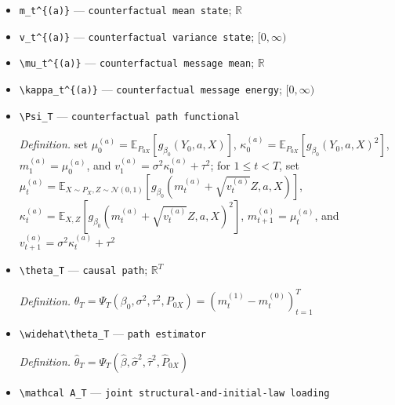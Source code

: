 \documentclass{article}
\begin{document}
\begin{itemize}
  \par\smallskip\noindent\emph{Definition.} write \(\bar e=N^{-1}\sum_j\widehat e_j\), \(\widehat z_{m,i}=\widehat e_i-\bar e\), and \(\widehat z_{v,i}=\widehat e_i\circ\widehat e_i-N^{-1}\sum_j\widehat e_j\circ\widehat e_j\); then \(\widehat\zeta_i=(\widehat L\widehat z_{m,i},\widehat A_v\{\widehat z_{v,i}-\widehat\sigma^2\widehat Q_\beta\widehat L\widehat z_{m,i}\},\delta_{(Y_{i0},X_i)}-\widehat P_{0X})\)
  \item \texttt{m\_\allowbreak{}t\textasciicircum{}\{(a)\}\allowbreak{}} --- \texttt{counterfactual mean state}; \(\mathbb R\)
  \item \texttt{v\_\allowbreak{}t\textasciicircum{}\{(a)\}\allowbreak{}} --- \texttt{counterfactual variance state}; \([0,\infty)\)
  \item \texttt{\textbackslash{}\allowbreak{}mu\_\allowbreak{}t\textasciicircum{}\{(a)\}\allowbreak{}} --- \texttt{counterfactual message mean}; \(\mathbb R\)
  \item \texttt{\textbackslash{}\allowbreak{}kappa\_\allowbreak{}t\textasciicircum{}\{(a)\}\allowbreak{}} --- \texttt{counterfactual message energy}; \([0,\infty)\)
  \item \texttt{\textbackslash{}\allowbreak{}Psi\_\allowbreak{}T} --- \texttt{counterfactual path functional}
  \par\smallskip\noindent\emph{Definition.} set \(\mu_0^{(a)}=\mathbb E_{P_{0X}}[g_{\beta_0}(Y_0,a,X)]\), \(\kappa_0^{(a)}=\mathbb E_{P_{0X}}[g_{\beta_0}(Y_0,a,X)^2]\), \(m_1^{(a)}=\mu_0^{(a)}\), and \(v_1^{(a)}=\sigma^2\kappa_0^{(a)}+\tau^2\); for \(1\le t<T\), set \(\mu_t^{(a)}=\mathbb E_{X\sim P_X,Z\sim\mathcal N(0,1)}[g_{\beta_0}(m_t^{(a)}+\sqrt{v_t^{(a)}}Z,a,X)]\), \(\kappa_t^{(a)}=\mathbb E_{X,Z}[g_{\beta_0}(m_t^{(a)}+\sqrt{v_t^{(a)}}Z,a,X)^2]\), \(m_{t+1}^{(a)}=\mu_t^{(a)}\), and \(v_{t+1}^{(a)}=\sigma^2\kappa_t^{(a)}+\tau^2\)
  \item \texttt{\textbackslash{}\allowbreak{}theta\_\allowbreak{}T} --- \texttt{causal path}; \(\mathbb R^T\)
  \par\smallskip\noindent\emph{Definition.} \(\theta_T=\Psi_T(\beta_0,\sigma^2,\tau^2,P_{0X})=(m_t^{(1)}-m_t^{(0)})_{t=1}^T\)
  \item \texttt{\textbackslash{}\allowbreak{}widehat\textbackslash{}\allowbreak{}theta\_\allowbreak{}T} --- \texttt{path estimator}
  \par\smallskip\noindent\emph{Definition.} \(\widehat\theta_T=\Psi_T(\widehat\beta,\widehat\sigma^2,\widehat\tau^2,\widehat P_{0X})\)
  \item \texttt{\textbackslash{}\allowbreak{}mathcal A\_\allowbreak{}T} --- \texttt{joint structural-\allowbreak{}and-\allowbreak{}initial-\allowbreak{}law loading}

\end{itemize}
\end{document}

